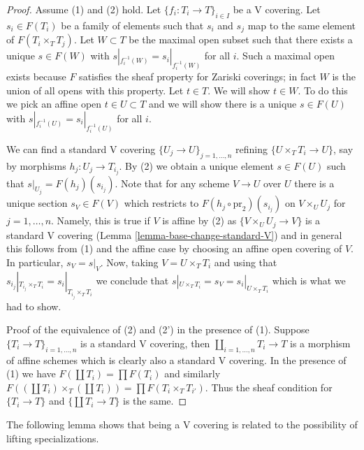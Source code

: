 \documentclass{stacks-project}
\theoremstyle{plain}
\theoremstyle{definition}
\theoremstyle{remark}
\numberwithin{equation}{subsection}
\begin{document}
\begin{proof}
Assume (1) and (2) hold.
Let $\{f_i : T_i \to T\}_{i \in I}$ be a V covering. Let $s_i \in F(T_i)$
be a family of elements such that $s_i$ and $s_j$ map to the same element
of $F(T_i \times_T T_j)$. Let $W \subset T$ be the maximal open subset
such that there exists a unique $s \in F(W)$ with
$s|_{f_i^{-1}(W)} = s_i|_{f_i^{-1}(W)}$ for all $i$.
Such a maximal open exists because $F$ satisfies the
sheaf property for Zariski coverings; in fact $W$ is the
union of all opens with this property. Let $t \in T$.
We will show $t \in W$. To do this we pick an affine open
$t \in U \subset T$ and we will show there is a unique
$s \in F(U)$ with
$s|_{f_i^{-1}(U)} = s_i|_{f_i^{-1}(U)}$ for all $i$.

\medskip\noindent
We can find a standard V covering
$\{U_j \to U\}_{j = 1, \ldots, n}$ refining $\{U \times_T T_i \to U\}$,
say by morphisms $h_j : U_j \to T_{i_j}$. By (2) we obtain a unique element
$s \in F(U)$ such that $s|_{U_j} = F(h_j)(s_{i_j})$. Note that for any
scheme $V \to U$ over $U$ there is a unique section $s_V \in F(V)$
which restricts to $F(h_j \circ \text{pr}_2)(s_{i_j})$ on
$V \times_U U_j$ for $j = 1, \ldots, n$. Namely, this is true if $V$
is affine by (2) as $\{V \times_U U_j \to V\}$ is a standard V covering
(Lemma \ref{lemma-base-change-standard-V})
and in general this follows from (1) and the affine case by choosing an
affine open covering of $V$. In particular, $s_V = s|_V$.
Now, taking $V = U \times_T T_i$ and using that
$s_{i_j}|_{T_{i_j} \times_T T_i} = s_i|_{T_{i_j} \times_T T_i}$
we conclude that $s|_{U \times_T T_i} = s_V = s_i|_{U \times_T T_i}$
which is what we had to show.

\medskip\noindent
Proof of the equivalence of (2) and (2') in the presence of (1).
Suppose $\{T_i \to T\}_{i = 1, \ldots, n}$ is a standard V covering, then
$\coprod_{i = 1, \ldots, n} T_i \to T$ is a morphism of affine schemes
which is clearly also a standard V covering.
In the presence of (1) we have $F(\coprod T_i) = \prod F(T_i)$
and similarly
$F((\coprod T_i) \times_T (\coprod T_i)) = \prod F(T_i \times_T T_{i'})$.
Thus the sheaf condition for $\{T_i \to T\}$ and $\{\coprod T_i \to T\}$
is the same.
\end{proof}

\noindent
The following lemma shows that being a V covering is
related to the possibility of lifting specializations.
\end{document}
